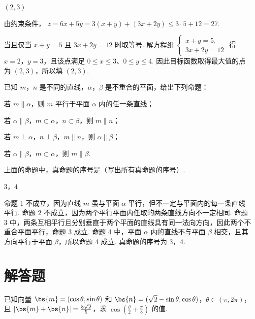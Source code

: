 \begin{answer}
\((2,3)\)
\end{answer}

\begin{solution}
由约束条件，
\(z=6x+5y=3(x+y)+(3x+2y)\leqslant3\cdot5+12=27\).

当且仅当 \(x+y=5\) 且 \(3x+2y=12\) 时取等号. 解方程组
\(\begin{cases}
x+y=5,\\
3x+2y=12
\end{cases}\) 得 \(x=2\)，\(y=3\)，且该点满足 \(0\leqslant x\leqslant3\)、\(0\leqslant y\leqslant4\). 因此目标函数取得最大值的点为 \((2,3)\)，所以填 \((2,3)\).
\end{solution}

\begin{problem}
已知 \(m\)，\(n\) 是不同的直线，\(\alpha\)，\(\beta\) 是不重合的平面，给出下列命题：

\begin{circlelist}
\item 若 \(m \parallel \alpha\)，则 \(m\) 平行于平面 \(\alpha\) 内的任一条直线；
\item 若 \(\alpha \parallel \beta\)，\(m \subset \alpha\)，\(n \subset \beta\)，则 \(m \parallel n\)；
\item 若 \(m \perp \alpha\)，\(n \perp \beta\)，\(m \parallel n\)，则 \(\alpha \parallel \beta\)；
\item 若 \(\alpha \parallel \beta\)，\(m \subset \alpha\)，则 \(m \parallel \beta\).
\end{circlelist}

上面的命题中，真命题的序号是（写出所有真命题的序号）\fillinblank{}.
\end{problem}

\begin{answer}
\(3\)，\(4\)
\end{answer}

\begin{solution}
命题 1 不成立，因为直线 \(m\) 虽与平面 \(\alpha\) 平行，但不一定与平面内的每一条直线平行. 命题 2 不成立，因为两个平行平面内任取的两条直线方向不一定相同. 命题 3 中，两条互相平行且分别垂直于两个平面的直线具有同一法向方向，因此两个不重合平面平行，命题 3 成立. 命题 4 中，平面 \(\alpha\) 内的直线不与平面 \(\beta\) 相交，且其方向平行于平面 \(\beta\)，所以命题 4 成立. 真命题的序号为 \(3\)，\(4\).
\end{solution}

\section{解答题}
\begin{problem}
已知向量 \(\bs{m} = (\cos \theta, \sin \theta)\) 和 \(\bs{n} = (\sqrt{2} - \sin \theta, \cos \theta)\)，\(\theta \in (\pi, 2\pi)\)，且 \(|\bs{m} + \bs{n}| = \frac{8\sqrt{2}}{5}\)，求 \(\cos \left(\frac{\theta}{2} + \frac{\pi}{8}\right)\) 的值.
\end{problem}

